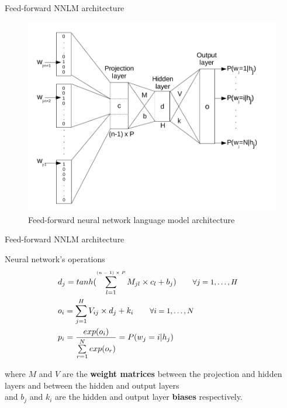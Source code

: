 \documentclass{beamer}
\begin{document}
\begin{frame}{Feed-forward NNLM architecture}

\begin{figure}[!htb]\centering
    \includegraphics[width=0.8\linewidth]{./images/architecture.png}
    \caption{Feed-forward neural network language model architecture}\label{diagram:architecture}
\end{figure}

\end{frame}


\begin{frame}{Feed-forward NNLM architecture}

\begin{exampleblock}{Neural network's operations}
\begin{equation}
\left.\begin{aligned}
    &d_j = tanh(\sum\limits_{l=1}^{\text{\tiny{$(n-1) \times P$}}}{M_{jl} \times c_l + b_j}) \qquad \text{\small{$\forall j = 1, \ldots, H$}}&\\
    &o_i = \sum\limits_{j=1}^{H}{V_{ij} \times d_j + k_i} \qquad \text{\small{$\forall i = 1, \ldots, N$}}&\\
    &p_i = \frac{exp(o_i)}{\sum\limits_{r=1}^{N}{exp(o_r)}} = P(w_j = i | h_j)&\\
\end{aligned}\right.
\end{equation}
\end{exampleblock}

where $M$ and $V$ are the \textbf{weight matrices} between the projection and hidden layers and between the hidden and output layers \\and $b_j$ and $k_i$ are the hidden and output layer \textbf{biases} respectively.

\end{frame}
\end{document}
